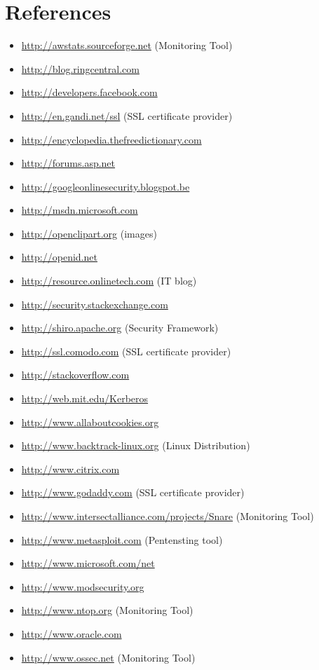 \section*{References}

\begin{itemize}
\item \url{http://awstats.sourceforge.net} (Monitoring Tool)
\item \url{http://blog.ringcentral.com}
\item \url{http://developers.facebook.com}
\item \url{http://en.gandi.net/ssl} (SSL certificate provider)
\item \url{http://encyclopedia.thefreedictionary.com}
\item \url{http://forums.asp.net}
\item \url{http://googleonlinesecurity.blogspot.be}
\item \url{http://msdn.microsoft.com}
\item \url{http://openclipart.org} (images)
\item \url{http://openid.net}
\item \url{http://resource.onlinetech.com} (IT blog)
\item \url{http://security.stackexchange.com}
\item \url{http://shiro.apache.org} (Security Framework)
\item \url{http://ssl.comodo.com} (SSL certificate provider)
\item \url{http://stackoverflow.com}
\item \url{http://web.mit.edu/Kerberos}
\item \url{http://www.allaboutcookies.org}
\item \url{http://www.backtrack-linux.org} (Linux Distribution)
\item \url{http://www.citrix.com}
\item \url{http://www.godaddy.com} (SSL certificate provider)
\item \url{http://www.intersectalliance.com/projects/Snare} (Monitoring Tool)
\item \url{http://www.metasploit.com} (Pentensting tool)
\item \url{http://www.microsoft.com/net}
\item \url{http://www.modsecurity.org}
\item \url{http://www.ntop.org} (Monitoring Tool)
\item \url{http://www.oracle.com}
\item \url{http://www.ossec.net} (Monitoring Tool)

\end{itemize}
